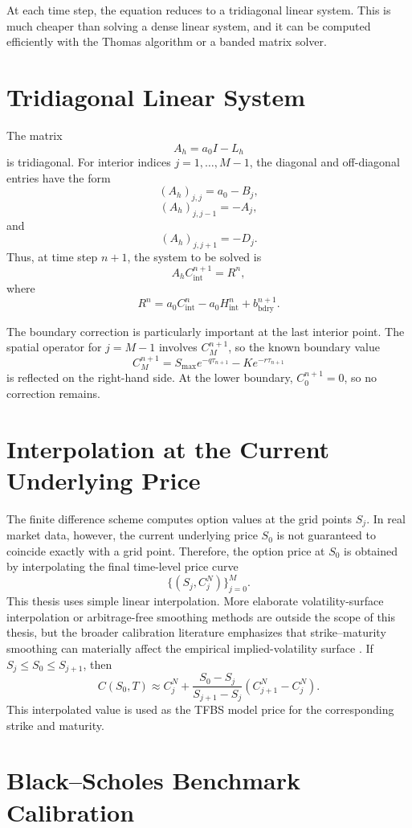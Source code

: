 \documentclass[11pt,a4paper]{report}
\begin{document}
At each time step, the equation reduces to a tridiagonal linear system. This is much cheaper than solving a dense linear system, and it can be computed efficiently with the Thomas algorithm or a banded matrix solver.

\section{Tridiagonal Linear System}

The matrix
\[
A_h=a_0 I-L_h
\]
is tridiagonal. For interior indices $j=1,\dots,M-1$, the diagonal and off-diagonal entries have the form
\[
(A_h)_{j,j}=a_0-B_j,
\]
\[
(A_h)_{j,j-1}=-A_j,
\]
and
\[
(A_h)_{j,j+1}=-D_j.
\]
Thus, at time step $n+1$, the system to be solved is
\[
A_h C_{\mathrm{int}}^{n+1}
=
R^n,
\]
where
\[
R^n
=
a_0 C_{\mathrm{int}}^n
-
a_0 H_{\mathrm{int}}^n
+
b_{\mathrm{bdry}}^{n+1}.
\]

The boundary correction is particularly important at the last interior point. The spatial operator for $j=M-1$ involves $C_M^{n+1}$, so the known boundary value
\[
C_M^{n+1}
=
S_{\max}e^{-q\tau_{n+1}}
-
Ke^{-r\tau_{n+1}}
\]
is reflected on the right-hand side. At the lower boundary, $C_0^{n+1}=0$, so no correction remains.

\section{Interpolation at the Current Underlying Price}

The finite difference scheme computes option values at the grid points $S_j$. In real market data, however, the current underlying price $S_0$ is not guaranteed to coincide exactly with a grid point. Therefore, the option price at $S_0$ is obtained by interpolating the final time-level price curve
\[
\{(S_j,C_j^N)\}_{j=0}^{M}.
\]
This thesis uses simple linear interpolation. More elaborate volatility-surface interpolation or arbitrage-free smoothing methods are outside the scope of this thesis, but the broader calibration literature emphasizes that strike--maturity smoothing can materially affect the empirical implied-volatility surface \cite{DumasFlemingWhaley1998,Gatheral2006}. If $S_j\le S_0\le S_{j+1}$, then
\[
C(S_0,T)
\approx
C_j^N
+
\frac{S_0-S_j}{S_{j+1}-S_j}
\left(
C_{j+1}^N-C_j^N
\right).
\]
This interpolated value is used as the TFBS model price for the corresponding strike and maturity.

\section{Black--Scholes Benchmark Calibration}
\end{document}
